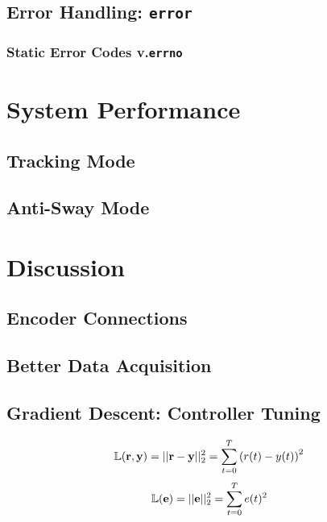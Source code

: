\documentclass[letterpaper]{article}
\begin{document}
\subsection{Error Handling: \texttt{error}}
\subsubsection{Static Error Codes v.\texttt{errno}}

\newpage

\section{System Performance}
\subsection{Tracking Mode}
\subsection{Anti-Sway Mode}

\newpage

\section{Discussion}
\subsection{Encoder Connections}
\subsection{Better Data Acquisition}
\subsection{Gradient Descent: Controller Tuning}
$$\mathbb{L}(\bold{r}, \bold{y})=||\bold{r}-\bold{y}||_2^2=\sum_{t=0}^{T}{\left(r(t)-y(t)\right)^2}$$
$$\mathbb{L}(\bold{e})=||\bold{e}||_2^2=\sum_{t=0}^{T}{e(t)^2}$$
\end{document}
